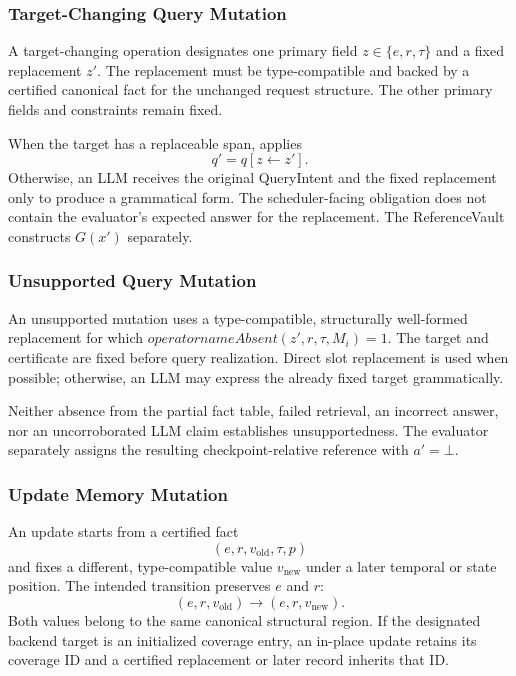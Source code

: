 \subsubsection{Target-Changing Query Mutation}

A target-changing operation designates one primary field
\(z\in\{e,r,\tau\}\) and a fixed replacement \(z'\). The replacement must be
type-compatible and backed by a certified canonical fact for the unchanged
request structure. The other primary fields and constraints remain fixed.

When the target has a replaceable span, \system applies
\[
q'=q[z\leftarrow z'].
\]
Otherwise, an LLM receives the original QueryIntent and the fixed replacement
only to produce a grammatical form. The scheduler-facing obligation does not
contain the evaluator's expected answer for the replacement. The ReferenceVault
constructs \(G(x')\) separately.

\subsubsection{Unsupported Query Mutation}

An unsupported mutation uses a type-compatible, structurally well-formed
replacement for which
\(operatorname{Absent}(z',r,\tau,M_i)=1\). The target and certificate are
fixed before query realization. Direct slot replacement is used when possible;
otherwise, an LLM may express the already fixed target grammatically.

Neither absence from the partial fact table, failed retrieval, an incorrect
answer, nor an uncorroborated LLM claim establishes unsupportedness. The
evaluator separately assigns the resulting checkpoint-relative reference with
\(a'=\bot\).

\subsubsection{Update Memory Mutation}

An update starts from a certified fact
\[
(e,r,v_{\mathrm{old}},\tau,p)
\]
and fixes a different, type-compatible value \(v_{\mathrm{new}}\) under a
later temporal or state position. The intended transition preserves \(e\) and
\(r\):
\[
(e,r,v_{\mathrm{old}})\longrightarrow(e,r,v_{\mathrm{new}}).
\]
Both values belong to the same canonical structural region. If the designated
backend target is an initialized coverage entry, an in-place update retains its
coverage ID and a certified replacement or later record inherits that ID.

